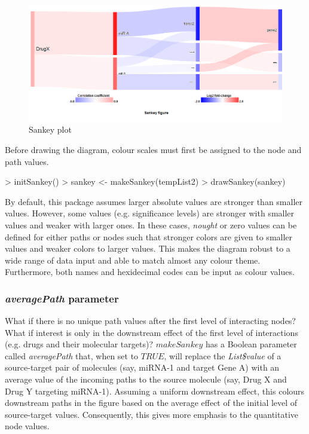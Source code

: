 \documentclass[a4paper]{article}
\begin{document}
\begin{figure}[htbp]
    \begin{center}
    \includegraphics[width=\textwidth]{figure1.png}
    \caption{Sankey plot}
    \end{center}
\end{figure}

Before drawing the diagram, colour scales  must first be assigned to the node and path values.
\begin{Schunk}
\begin{Sinput}
> initSankey()
> sankey <- makeSankey(tempList2)
> drawSankey(sankey)
\end{Sinput}
\end{Schunk}

By default, this package assumes larger absolute values are stronger than smaller values. However, some values (e.g. significance levels)  are stronger with smaller values and weaker with larger ones. In these cases, \textit{nought} or zero values can be defined for either paths or nodes such that stronger colors are given to smaller values and weaker colors to larger values. This makes the diagram robust to a wide range of data input and able to match almost any colour theme. Furthermore, both names and hexidecimal codes can be input as colour values.

    \subsubsection{\textit{averagePath} parameter}
What if there is no unique path values after the first level of interacting nodes? What if interest is only in the downstream effect of the first level of interactions (e.g. drugs and their molecular targets)? $makeSankey$ has a Boolean parameter called \textit{averagePath} that, when set to $TRUE$, will replace the \textit{List\$value} of a source-target pair of molecules (say, miRNA-1 and target Gene A) with an average value of the incoming paths to the source molecule (say, Drug X and Drug Y targeting miRNA-1). Assuming a uniform downstream effect, this colours downstream paths in the figure based on the average effect of the initial level of source-target values. Consequently, this gives more emphasis to the quantitative node values.
\end{document}
